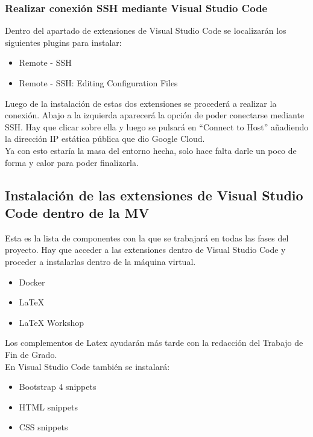 \subsubsection{Realizar conexión SSH mediante Visual Studio Code}
Dentro del apartado de extensiones de Visual Studio Code se localizarán los siguientes plugins para instalar:

\begin{itemize}
    \item Remote - SSH
    \item Remote - SSH: Editing Configuration Files
\end{itemize}

Luego de la instalación de estas dos extensiones se procederá a realizar la conexión. Abajo a la izquierda aparecerá la opción de poder conectarse mediante SSH. Hay que clicar sobre ella y luego se pulsará en ``Connect to Host'' añadiendo la dirección IP estática pública que dio Google Cloud.
\\Ya con esto estaría la masa del entorno hecha, solo hace falta darle un poco de forma y calor para poder finalizarla.

\subsection{Instalación de las extensiones de Visual Studio Code dentro de la MV}

Esta es la lista de componentes con la que se trabajará en todas las fases del proyecto. Hay que acceder a las extensiones dentro de Visual Studio Code y proceder a instalarlas dentro de la máquina virtual.

\begin{itemize}
    \item Docker
    \item LaTeX
    \item LaTeX Workshop
\end{itemize}

Los complementos de Latex ayudarán más tarde con la redacción del Trabajo de Fin de Grado.
\\En Visual Studio Code también se instalará:

\begin{itemize}
    \item Bootstrap 4 snippets
    \item HTML snippets
    \item CSS snippets
\end{itemize}

